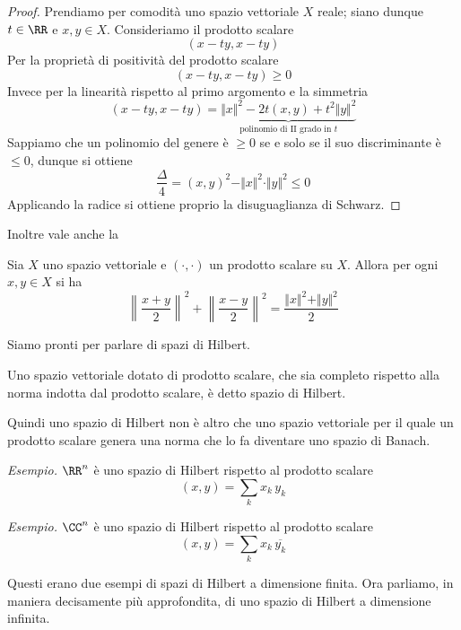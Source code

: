 \begin{proof}
Prendiamo per comodità uno spazio vettoriale $X$ reale; siano dunque $t\in\RR$ e $x,y\in X$. Consideriamo il prodotto scalare
$$
(x-ty,x-ty)
$$
Per la proprietà di positività del prodotto scalare
$$
(x-ty,x-ty)\geq0
$$
Invece per la linearità rispetto al primo argomento e la simmetria
$$
(x-ty,x-ty)=\underbrace{\Vert x\Vert^2-2t(x,y)+t^2\Vert y\Vert^2}_{\text{polinomio di II grado in }t}
$$
Sappiamo che un polinomio del genere è $\geq 0$ se e solo se il suo discriminante è $\leq 0$, dunque si ottiene
$$
\frac{\Delta}{4}=(x,y)^2-\Vert x\Vert^2 \cdot \Vert y \Vert^2\leq 0
$$
Applicando la radice si ottiene proprio la disuguaglianza di Schwarz.
\end{proof}

Inoltre vale anche la
\begin{thm}
Sia $X$ uno spazio vettoriale e $(\cdot,\cdot)$ un prodotto scalare su $X$. Allora per ogni $x,y\in X$ si ha
\begin{equation*}
\left\|\frac{x+y}{2}\right\|^2+\left\|\frac{x-y}{2}\right\|^2=\frac{\Vert x\Vert^2 + \Vert y \Vert^2}{2}
\end{equation*}
\end{thm}

Siamo pronti per parlare di spazi di Hilbert.

\begin{defn}
Uno spazio vettoriale dotato di prodotto scalare, che sia completo rispetto alla norma indotta dal prodotto scalare, è detto spazio di Hilbert.
\end{defn}
Quindi uno spazio di Hilbert non è altro che uno spazio vettoriale per il quale un prodotto scalare genera una norma che lo fa diventare uno spazio di Banach.

\textit{Esempio.} 
$\RR^n$ è uno spazio di Hilbert rispetto al prodotto scalare
\begin{equation*}
(x,y)=\sum_k x_k\, y_k
\end{equation*}

\textit{Esempio.} 
$\CC^n$ è uno spazio di Hilbert rispetto al prodotto scalare
\begin{equation*}
(x,y)=\sum_k x_k\, \overline{y_k}
\end{equation*}

Questi erano due esempi di spazi di Hilbert a dimensione finita. Ora parliamo, in maniera decisamente più approfondita, di uno spazio di Hilbert a dimensione infinita.

